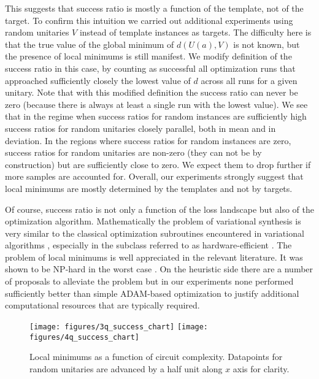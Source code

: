 \documentclass[amsfonts, amssymb, aps, nofootinbib]{revtex4-2}
\begin{document}
This suggests that success ratio is mostly a function of the template, not of the target. To confirm this  intuition  we carried out additional experiments using random unitaries $V$ instead of template instances as targets. The difficulty here is that the true value of the global minimum of $d(U(a), V)$ is not known, but the presence of local minimums is still manifest. We modify definition of the success ratio in this case, by counting as successful all optimization runs that approached sufficiently closely the lowest value of $d$ across all runs for a given unitary. Note that with this modified definition the success ratio can never be zero (because there is always at least a single run with the lowest value). We see that in the regime when success ratios for random instances are sufficiently high success ratios for random unitaries closely parallel, both in mean and in deviation. In the regions where success ratios for random instances are zero, success ratios for random unitaries are non-zero (they can not be by construction) but are sufficiently close to zero. We expect them to drop further if more samples are accounted for. Overall, our experiments strongly suggest that local minimums are mostly determined by the templates and not by targets.

Of course, success ratio is not only a function of the loss landscape but also of the optimization algorithm. Mathematically the problem of variational synthesis is very similar to the classical optimization subroutines encountered in variational algorithms \cite{}, especially in the subclass referred to as  hardware-efficient \cite{Kandala2017}\cite{}. The problem of local minimums is well appreciated in the relevant literature. It was shown to be NP-hard in the worst case \cite{Bittel2021}. On the heuristic side there are a number of proposals to alleviate the problem \cite{Wierichs2020, Rivera-Dean2021, ?} but in our experiments none performed sufficiently better than simple ADAM\cite{adam}-based optimization to justify additional computational resources that are typically required.

\begin{figure}
\texttt{[image: figures/3q\_success\_chart]}
\texttt{[image: figures/4q\_success\_chart]}
\caption{Local minimums as a function of circuit complexity. Datapoints for random unitaries are advanced by a half unit along $x$ axis for clarity.}
\label{fig local minumums}
\end{figure}
\end{document}
